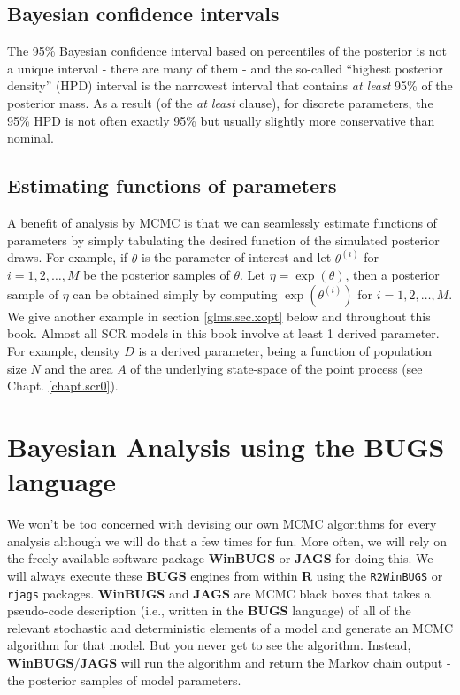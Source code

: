 \subsection{Bayesian confidence intervals}

The 95\% Bayesian confidence interval based on percentiles of the posterior
is not a unique interval - there are many of them - and the so-called
``highest posterior density'' (HPD) interval is the narrowest
interval
 that
contains {\it at least} 95\%  of the posterior mass.
As a result (of the {\it at least} clause), for discrete parameters, the
95\% HPD is not often exactly 95\% but usually slightly more
conservative than nominal.

\subsection{Estimating functions of parameters}

A benefit of analysis by MCMC is that we can seamlessly estimate
functions of parameters by simply tabulating the desired function of
the simulated posterior draws. For example, if $\theta$ is the
parameter of interest and let $\theta^{(i)}$ for $i=1,2,\ldots,M$ be
the posterior samples of $\theta$. Let $\eta = \exp(\theta)$, then a
posterior sample of $\eta$ can be obtained simply by computing
$\exp(\theta^{(i)})$ for $i=1,2,\ldots,M$. We give another example in
section
\ref{glms.sec.xopt}
below and throughout this book.
Almost all SCR models in this book involve at least 1 derived
parameter. For example, density $D$ is a derived parameter, being a
function of population size $N$ and the area $A$ of the underlying
state-space of the point process (see Chapt. \ref{chapt.scr0}).

\section{Bayesian Analysis using the BUGS language}

We won't be too concerned with devising our own MCMC algorithms for
every analysis
although we will do that a few times for fun.  More often, we
will rely on the freely available software package {\bf WinBUGS} or
{\bf JAGS}
for doing this.  We will always execute these {\bf BUGS} engines from
within {\bf R} using the \mbox{\tt R2WinBUGS} \citep{sturtz_etal:2005}
or 
\mbox{\tt rjags} \citep{plummer:2009} packages. 
{\bf WinBUGS} and {\bf JAGS} are  MCMC black boxes
that takes a pseudo-code description (i.e., written in the {\bf BUGS}
language) of all of the relevant stochastic
and deterministic elements of a model and generate an MCMC algorithm
for that model. But you never get to see the algorithm. Instead,
{\bf WinBUGS}/{\bf JAGS} will run the 
algorithm and  return the Markov chain output
- the posterior samples of model parameters.

